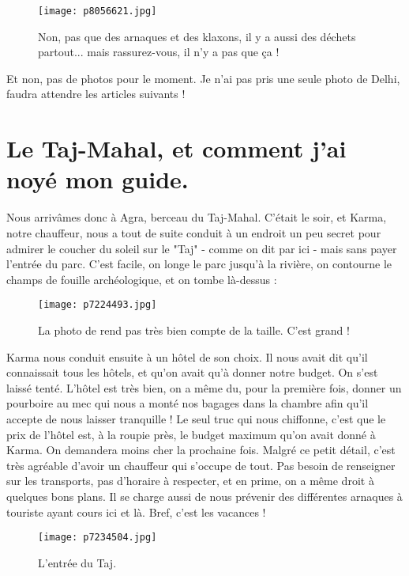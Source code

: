 \documentclass{book}
\begin{document}
\begin{figure}[h]
\centering
\texttt{[image: p8056621.jpg]}
\caption*{Non, pas que des arnaques et des klaxons, il y a aussi des déchets partout... mais rassurez-vous, il n'y a pas que ça !}
\end{figure}

Et non, pas de photos pour le moment. Je n'ai pas pris une seule photo de Delhi, faudra attendre les articles suivants !

\chapter{Le Taj-Mahal, et comment j'ai noyé mon guide.}
Nous arrivâmes donc à Agra, berceau du Taj-Mahal. C'était le soir, et Karma, notre chauffeur, nous a tout de suite conduit à un endroit un peu secret pour admirer le coucher du soleil sur le "Taj" - comme on dit par ici - mais sans payer l'entrée du parc. C'est facile, on longe le parc jusqu'à la rivière, on contourne le champs de fouille archéologique, et on tombe là-dessus :


\begin{figure}[h]
\centering
\texttt{[image: p7224493.jpg]}
\caption*{La photo de rend pas très bien compte de la taille. C'est grand !}
\end{figure}

Karma nous conduit ensuite à un hôtel de son choix. Il nous avait dit qu'il connaissait tous les hôtels, et qu'on avait qu'à donner notre budget. On s'est laissé tenté. L'hôtel est très bien, on a même du, pour la première fois, donner un pourboire au mec qui nous a monté nos bagages dans la chambre afin qu'il accepte de nous laisser tranquille ! Le seul truc qui nous chiffonne, c'est que le prix de l'hôtel est, à la roupie près, le budget maximum qu'on avait donné à Karma. On demandera moins cher la prochaine fois. Malgré ce petit détail, c'est très agréable d'avoir un chauffeur qui s'occupe de tout. Pas besoin de renseigner sur les transports, pas d'horaire à respecter, et en prime, on a même droit à quelques bons plans. Il se charge aussi de nous prévenir des différentes arnaques à touriste ayant cours ici et là. Bref, c'est les vacances !


\begin{figure}[h]
\centering
\texttt{[image: p7234504.jpg]}
\caption*{L'entrée du Taj.}
\end{figure}
\end{document}
